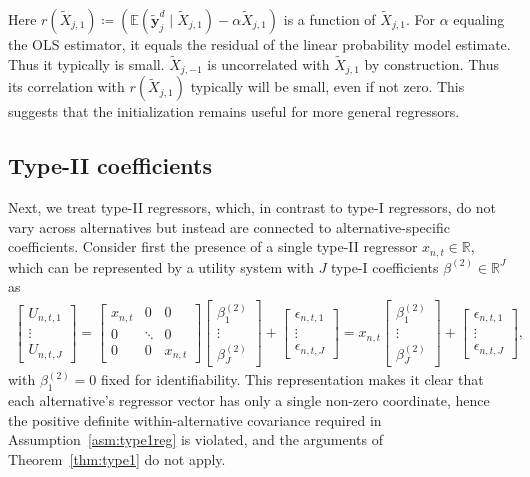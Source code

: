 \documentclass[preprint,12pt,authoryear]{elsarticle}
\newcommand{\R}{\mathbb{R}}
\newcommand{\E}{\mathbb{E}}
\begin{document}
Here $r(\tilde{X}_{j,1}) \coloneq (\E(\tilde{\bm{y}}^d_{j}  \mid \tilde{X}_{j,1}) - \alpha \tilde X_{j,1})$ is a function of $\tilde{X}_{j,1}$. For
$\alpha$ equaling the OLS estimator, it equals the residual
of the linear probability model estimate. Thus it typically
is small. $\tilde X_{j,-1}$ is uncorrelated with $\tilde{X}_{j,1}$ by construction. Thus its correlation with $r(\tilde{X}_{j,1})$ typically will be small, even if not zero.
This suggests that the initialization remains useful for more general regressors.

\subsection{Type-II coefficients}\label{sec:type2}

Next, we treat type-II regressors, which, in contrast to type-I regressors, do not vary across alternatives but instead are connected to alternative-specific coefficients. Consider first the presence of a single type-II regressor $x_{n,t} \in \R$, which can be represented by a utility system with $J$ type-I coefficients $\beta^{(2)} \in \R^J$ as
%
\begin{align}
    \label{eq:type2system}
    \begin{bmatrix} U_{n,t,1} \\ \vdots \\ U_{n,t,J} \end{bmatrix} = \begin{bmatrix} x_{n,t} & 0 & 0 \\ 0 & \ddots & 0 \\ 0 & 0 & x_{n,t} \end{bmatrix} \begin{bmatrix} \beta^{(2)}_1 \\ \vdots \\ \beta^{(2)}_J \end{bmatrix} + \begin{bmatrix} \epsilon_{n,t,1} \\ \vdots \\ \epsilon_{n,t,J} \end{bmatrix}
    = x_{n,t} \begin{bmatrix} \beta^{(2)}_1 \\ \vdots \\ \beta^{(2)}_J \end{bmatrix} + \begin{bmatrix} \epsilon_{n,t,1} \\ \vdots \\ \epsilon_{n,t,J} \end{bmatrix}
    ,
\end{align}
%
with $\beta^{(2)}_1 = 0$ fixed for identifiability. This representation makes it clear that each alternative's regressor vector has only a single non-zero coordinate, hence the positive definite within-alternative covariance required in Assumption~\ref{asm:type1reg} is violated, and the arguments of Theorem~\ref{thm:type1} do not apply.
\end{document}
